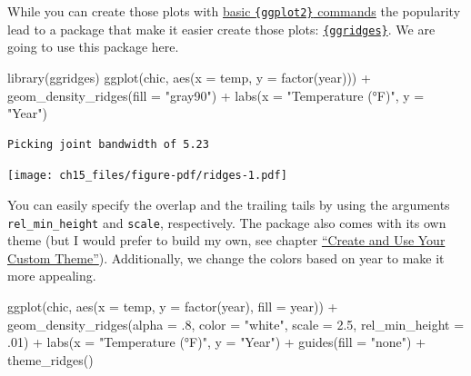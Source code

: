 \documentclass[
  letterpaper,
]{scrbook}
\newenvironment{Shaded}{\begin{snugshade}}{\end{snugshade}}
\newcommand{\AttributeTok}[1]{\textcolor[rgb]{0.40,0.45,0.13}{#1}}
\newcommand{\DecValTok}[1]{\textcolor[rgb]{0.68,0.00,0.00}{#1}}
\newcommand{\FloatTok}[1]{\textcolor[rgb]{0.68,0.00,0.00}{#1}}
\newcommand{\FunctionTok}[1]{\textcolor[rgb]{0.28,0.35,0.67}{#1}}
\newcommand{\NormalTok}[1]{\textcolor[rgb]{0.00,0.23,0.31}{#1}}
\newcommand{\SpecialCharTok}[1]{\textcolor[rgb]{0.37,0.37,0.37}{#1}}
\newcommand{\StringTok}[1]{\textcolor[rgb]{0.13,0.47,0.30}{#1}}
\begin{document}
While you can create those plots with
\href{https://github.com/halhen/viz-pub/blob/master/sports-time-of-day/2_gen_chart.R}{basic
\texttt{\{ggplot2\}} commands} the popularity lead to a package that
make it easier create those plots:
\href{https://wilkelab.org/ggridges/}{\texttt{\{ggridges\}}}. We are
going to use this package here.

\begin{Shaded}
\begin{Highlighting}[]
\FunctionTok{library}\NormalTok{(ggridges)}
\FunctionTok{ggplot}\NormalTok{(chic, }\FunctionTok{aes}\NormalTok{(}\AttributeTok{x =}\NormalTok{ temp, }\AttributeTok{y =} \FunctionTok{factor}\NormalTok{(year))) }\SpecialCharTok{+}
   \FunctionTok{geom\_density\_ridges}\NormalTok{(}\AttributeTok{fill =} \StringTok{"gray90"}\NormalTok{) }\SpecialCharTok{+}
   \FunctionTok{labs}\NormalTok{(}\AttributeTok{x =} \StringTok{"Temperature (°F)"}\NormalTok{, }\AttributeTok{y =} \StringTok{"Year"}\NormalTok{)}
\end{Highlighting}
\end{Shaded}

\begin{verbatim}
Picking joint bandwidth of 5.23
\end{verbatim}

\texttt{[image: ch15\_files/figure-pdf/ridges-1.pdf]}

You can easily specify the overlap and the trailing tails by using the
arguments \texttt{rel\_min\_height} and \texttt{scale}, respectively.
The package also comes with its own theme (but I would prefer to build
my own, see chapter \hyperref[themes]{``Create and Use Your Custom
Theme''}). Additionally, we change the colors based on year to make it
more appealing.

\begin{Shaded}
\begin{Highlighting}[]
\FunctionTok{ggplot}\NormalTok{(chic, }\FunctionTok{aes}\NormalTok{(}\AttributeTok{x =}\NormalTok{ temp, }\AttributeTok{y =} \FunctionTok{factor}\NormalTok{(year), }\AttributeTok{fill =}\NormalTok{ year)) }\SpecialCharTok{+}
  \FunctionTok{geom\_density\_ridges}\NormalTok{(}\AttributeTok{alpha =}\NormalTok{ .}\DecValTok{8}\NormalTok{, }\AttributeTok{color =} \StringTok{"white"}\NormalTok{,}
                      \AttributeTok{scale =} \FloatTok{2.5}\NormalTok{, }\AttributeTok{rel\_min\_height =}\NormalTok{ .}\DecValTok{01}\NormalTok{) }\SpecialCharTok{+}
  \FunctionTok{labs}\NormalTok{(}\AttributeTok{x =} \StringTok{"Temperature (°F)"}\NormalTok{, }\AttributeTok{y =} \StringTok{"Year"}\NormalTok{) }\SpecialCharTok{+}
  \FunctionTok{guides}\NormalTok{(}\AttributeTok{fill =} \StringTok{"none"}\NormalTok{) }\SpecialCharTok{+}
  \FunctionTok{theme\_ridges}\NormalTok{()}
\end{Highlighting}
\end{Shaded}
\end{document}
